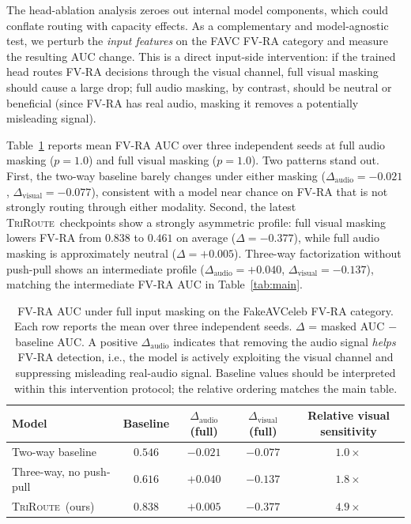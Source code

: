 \documentclass{article}
\newcommand{\method}{\textsc{TriRoute}}
\begin{document}
The head-ablation analysis zeroes out internal model components, which could conflate routing with capacity effects. As a complementary and model-agnostic test, we perturb the \emph{input features} on the FAVC FV-RA category and measure the resulting AUC change. This is a direct input-side intervention: if the trained head routes FV-RA decisions through the visual channel, full visual masking should cause a large drop; full audio masking, by contrast, should be neutral or beneficial (since FV-RA has real audio, masking it removes a potentially misleading signal).

Table~\ref{tab:perturbation} reports mean FV-RA AUC over three independent seeds at full audio masking ($p=1.0$) and full visual masking ($p=1.0$). Two patterns stand out. First, the two-way baseline barely changes under either masking ($\Delta_{\mathrm{audio}}=-0.021$, $\Delta_{\mathrm{visual}}=-0.077$), consistent with a model near chance on FV-RA that is not strongly routing through either modality. Second, the latest \method\ checkpoints show a strongly asymmetric profile: full visual masking lowers FV-RA from $0.838$ to $0.461$ on average ($\Delta=-0.377$), while full audio masking is approximately neutral ($\Delta=+0.005$). Three-way factorization without push-pull shows an intermediate profile ($\Delta_{\mathrm{audio}}=+0.040$, $\Delta_{\mathrm{visual}}=-0.137$), matching the intermediate FV-RA AUC in Table~\ref{tab:main}.

\begin{table}[t]
    \centering
    \caption{FV-RA AUC under full input masking on the FakeAVCeleb FV-RA category. Each row reports the mean over three independent seeds. $\Delta$ = masked AUC $-$ baseline AUC. A positive $\Delta_{\mathrm{audio}}$ indicates that removing the audio signal \emph{helps} FV-RA detection, i.e., the model is actively exploiting the visual channel and suppressing misleading real-audio signal. Baseline values should be interpreted within this intervention protocol; the relative ordering matches the main table.}
    \label{tab:perturbation}
    \small
    \begin{tabular}{lcccc}
        \toprule
        Model & Baseline & $\Delta_{\mathrm{audio}}$ (full) & $\Delta_{\mathrm{visual}}$ (full) & Relative visual sensitivity \\
        \midrule
        Two-way baseline        & $0.546$ & $-0.021$ & $-0.077$ & $1.0\times$ \\
        Three-way, no push-pull & $0.616$ & $+0.040$ & $-0.137$ & $1.8\times$ \\
        \method\ (ours) & $\mathbf{0.838}$ & $\mathbf{+0.005}$ & $\mathbf{-0.377}$ & $\mathbf{4.9\times}$ \\
        \bottomrule
    \end{tabular}
\end{table}
\end{document}
